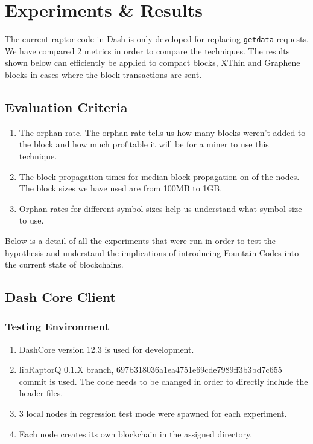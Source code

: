 \chapter{Experiments \& Results}

The current raptor code in Dash is only developed for replacing \texttt{getdata} requests.
We have compared 2 metrics in order to compare the techniques. The results shown
below can efficiently be applied to compact blocks, XThin and Graphene blocks in
cases where the block transactions are sent.

\section{Evaluation Criteria}

\begin{enumerate}
    \item The orphan rate. The orphan rate tells us how many blocks weren’t
    added to the block and how much profitable it will be for a miner to use
    this technique.
    \item The block propagation times for median block propagation on
    of the nodes.  
        The block sizes we have used are from 100MB to 1GB.
    \item Orphan rates for different symbol sizes help us understand what symbol
        size to use.

\end{enumerate}

Below is a detail of all the experiments that were run in order to test the
hypothesis and understand the implications of introducing Fountain Codes into
the current state of blockchains.

\section{Dash Core Client}
\subsection{Testing Environment}
\begin{enumerate}
    \item DashCore version 12.3 is used for development.
    \item libRaptorQ \citep{libraptor} 0.1.X branch, 697b318036a1ea4751e69cde7989ff3b3bd7c655
    commit is used. The code needs to be changed in order to directly include
    the header files. 
    \item 3 local nodes in regression test mode were spawned for each
    experiment.
    \item Each node creates its own blockchain in the assigned directory.
\end{enumerate}

